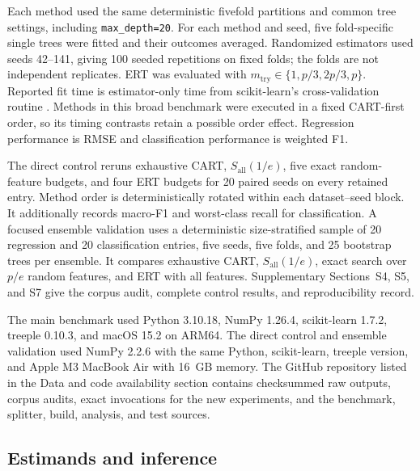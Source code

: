 \documentclass[final,5p,times,twocolumn]{elsarticle}
\begin{document}
\begin{table}[!b]
\centering
\caption{Retained PMLB datasets: Q1/median/Q3, with ranges in parentheses.}
\label{tab:datasets}
\resizebox{\columnwidth}{!}{}
\end{table}

Each method used the same deterministic fivefold partitions and common tree settings, including \texttt{max\_depth=20}. For each method and seed, five fold-specific single trees were fitted and their outcomes averaged. Randomized estimators used seeds 42--141, giving 100 seeded repetitions on fixed folds; the folds are not independent replicates. ERT was evaluated with \(m_{\mathrm{try}}\in\{1,p/3,2p/3,p\}\). Reported fit time is estimator-only time from scikit-learn's cross-validation routine \cite{pedregosa2011scikit}. Methods in this broad benchmark were executed in a fixed CART-first order, so its timing contrasts retain a possible order effect. Regression performance is RMSE and classification performance is weighted F1.

The direct control reruns exhaustive CART, \(S_{\mathrm{all}}(1/e)\), five exact random-feature budgets, and four ERT budgets for 20 paired seeds on every retained entry. Method order is deterministically rotated within each dataset--seed block. It additionally records macro-F1 and worst-class recall for classification. A focused ensemble validation uses a deterministic size-stratified sample of 20 regression and 20 classification entries, five seeds, five folds, and 25 bootstrap trees per ensemble. It compares exhaustive CART, \(S_{\mathrm{all}}(1/e)\), exact search over \(p/e\) random features, and ERT with all features. Supplementary Sections~S4, S5, and S7 give the corpus audit, complete control results, and reproducibility record.

The main benchmark used Python 3.10.18, NumPy 1.26.4, scikit-learn 1.7.2, treeple 0.10.3, and macOS 15.2 on ARM64. The direct control and ensemble validation used NumPy 2.2.6 with the same Python, scikit-learn, treeple version, and Apple M3 MacBook Air with 16~GB memory. The GitHub repository listed in the Data and code availability section contains checksummed raw outputs, corpus audits, exact invocations for the new experiments, and the benchmark, splitter, build, analysis, and test sources.

\subsection{Estimands and inference}
\end{document}
